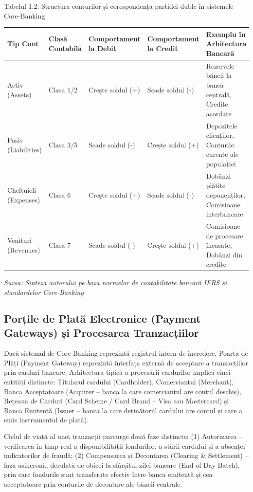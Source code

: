 Tabelul 1.2: Structura conturilor și corespondența partidei duble în sistemele Core-Banking

\begin{table}[htbp]
\centering
\small
\begin{tabular}{p{} p{} p{} p{} p{}}
\toprule
Tip Cont & Clasă Contabilă & Comportament la Debit & Comportament la Credit & Exemplu în Arhitectura Bancară \\
\midrule
Activ (Assets) & Clasa 1/2 & Crește soldul (+) & Scade soldul (-) & Rezervele băncii la banca centrală, Credite acordate \\
Pasiv (Liabilities) & Clasa 3/5 & Scade soldul (-) & Crește soldul (+) & Depozitele clienților, Conturile curente ale populației \\
Cheltuieli (Expenses) & Clasa 6 & Crește soldul (+) & Scade soldul (-) & Dobânzi plătite deponenților, Comisioane interbancare \\
Venituri (Revenues) & Clasa 7 & Scade soldul (-) & Crește soldul (+) & Comisioane de procesare încasate, Dobânzi din credite \\
\bottomrule
\end{tabular}
\end{table}

\textit{Sursa: Sinteza autorului pe baza normelor de contabilitate bancară IFRS și standardelor Core-Banking}

\subsection{Porțile de Plată Electronice (Payment Gateways) și Procesarea Tranzacțiilor}

Dacă sistemul de Core-Banking reprezintă registrul intern de încredere, Poarta de Plăți (Payment Gateway) reprezintă interfața externă de acceptare a tranzacțiilor prin carduri bancare. Arhitectura tipică a procesării cardurilor implică cinci entități distincte: Titularul cardului (Cardholder), Comerciantul (Merchant), Banca Acceptatoare (Acquirer – banca la care comerciantul are contul deschis), Rețeaua de Carduri (Card Scheme / Card Brand – Visa sau Mastercard) și Banca Emitentă (Issuer – banca la care deținătorul cardului are contul și care a emis instrumentul de plată).

Ciclul de viață al unei tranzacții parcurge două faze distincte: (1) Autorizarea – verificarea în timp real a disponibilității fondurilor, a stării cardului și a absenței indicatorilor de fraudă; (2) Compensarea și Decontarea (Clearing \& Settlement) – faza asincronă, derulată de obicei la sfârșitul zilei bancare (End-of-Day Batch), prin care fondurile sunt transferate efectiv între banca emitentă și cea acceptatoare prin conturile de decontare ale băncii centrale.


